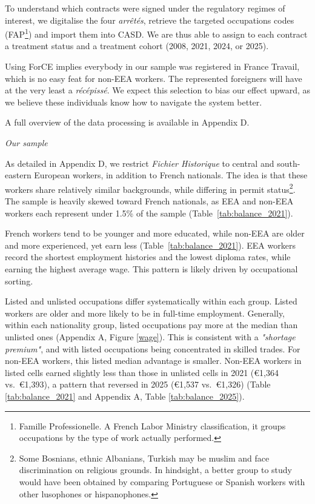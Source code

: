 \documentclass[10pt, a4paper]{article}
\begin{document}
\noindent To understand which contracts were signed under the regulatory regimes of interest, we digitalise the four \textit{arrêtés}, retrieve the targeted occupations codes (FAP\footnote{Famille Professionelle. A French Labor Ministry classification, it groups occupations by the type of work actually performed.}) and import them into CASD. We are thus able to assign to each contract a treatment status and a treatment cohort (2008, 2021, 2024, or 2025). 

\noindent Using ForCE implies everybody in our sample was registered in France Travail, which is no easy feat for non-EEA workers. The represented foreigners will have at the very least a \textit{récépissé}. We expect this selection to bias our effect upward, as we believe these individuals know how to navigate the system better.

\noindent  A full overview of the data processing is available in Appendix D. 
\medskip

\noindent \textit{Our sample} 
\smallskip

\noindent As detailed in Appendix D, we restrict \textit{Fichier Historique} to central and south-eastern European workers, in addition to French nationals. The idea is that these workers share relatively similar backgrounds, while differing in permit status\footnote{Some Bosnians, ethnic Albanians, Turkish may be muslim and face discrimination on religious grounds. In hindsight, a better group to study would have been obtained by comparing Portuguese or Spanish workers with other lusophones or hispanophones.}. The sample is heavily skewed toward French nationals, as EEA and non-EEA workers each represent under 1.5\% of the sample
(Table~\ref{tab:balance_2021}). 

\noindent French workers tend to be younger and more educated, while non-EEA are older and more experienced, yet earn less (Table~\ref{tab:balance_2021}). EEA workers record the shortest employment histories and the lowest diploma rates, while earning the highest average wage. This pattern is likely driven by occupational sorting.

\noindent Listed and unlisted occupations differ systematically within each group. Listed workers are older and more likely to be in full-time employment. Generally, within each nationality group, listed occupations pay more at the median than unlisted ones (Appendix A, Figure \ref{wage}). This is consistent with a \textit{"shortage premium"}, and with listed occupations being concentrated in skilled trades. For non-EEA workers, this listed median advantage is smaller. Non-EEA workers in listed cells earned slightly less than those in unlisted cells in 2021 (€1,364 vs.\ €1,393), a pattern that reversed in 2025 (€1,537 vs.\ €1,326) (Table \ref{tab:balance_2021} and Appendix A, Table \ref{tab:balance_2025}).
\end{document}
